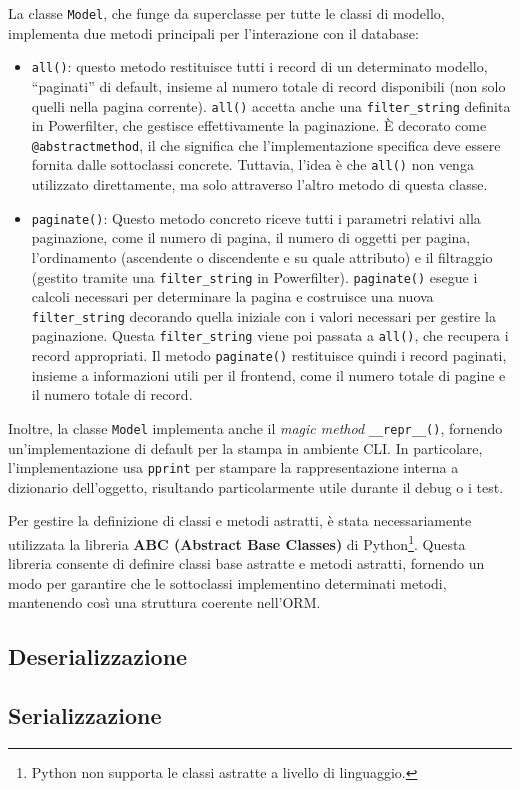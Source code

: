 La classe \texttt{Model}, che funge da superclasse per tutte le classi di modello, implementa due metodi principali per l'interazione con il database:
\begin{itemize}
    \item \texttt{all()}: questo metodo restituisce tutti i record di un determinato modello, ``paginati'' di default, insieme al numero totale di record disponibili (non solo quelli nella pagina corrente). \texttt{all()} accetta anche una \texttt{filter\_string} definita in Powerfilter, che gestisce effettivamente la paginazione. È decorato come \texttt{@abstractmethod}, il che significa che l'implementazione specifica deve essere fornita dalle sottoclassi concrete. Tuttavia, l'idea è che \texttt{all()} non venga utilizzato direttamente, ma solo attraverso l'altro metodo di questa classe.
    \item \texttt{paginate()}: Questo metodo concreto riceve tutti i parametri relativi alla paginazione, come il numero di pagina, il numero di oggetti per pagina, l'ordinamento (ascendente o discendente e su quale attributo) e il filtraggio (gestito tramite una \texttt{filter\_string} in Powerfilter). \texttt{paginate()} esegue i calcoli necessari per determinare la pagina e costruisce una nuova \texttt{filter\_string} decorando quella iniziale con i valori necessari per gestire la paginazione. Questa \texttt{filter\_string} viene poi passata a \texttt{all()}, che recupera i record appropriati. Il metodo \texttt{paginate()} restituisce quindi i record paginati, insieme a informazioni utili per il frontend, come il numero totale di pagine e il numero totale di record.
\end{itemize}

Inoltre, la classe \texttt{Model} implementa anche il \emph{magic method} \texttt{\_\_repr\_\_()}, fornendo un'implementazione di default per la stampa in ambiente CLI. In particolare, l'implementazione usa \texttt{pprint} per stampare la rappresentazione interna a dizionario dell'oggetto, risultando particolarmente utile durante il debug o i test.

Per gestire la definizione di classi e metodi astratti, è stata necessariamente utilizzata la libreria \textbf{ABC (Abstract Base Classes)} di Python\footnote{Python non supporta le classi astratte a livello di linguaggio.}. Questa libreria consente di definire classi base astratte e metodi astratti, fornendo un modo per garantire che le sottoclassi implementino determinati metodi, mantenendo così una struttura coerente nell'ORM.

\subsection{Deserializzazione}

\subsection{Serializzazione}
